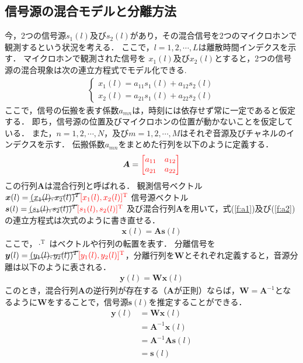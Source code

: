 \subsection{信号源の混合モデルと分離方法}
今，2つの信号源$s_1(l)$及び$s_2(l)$があり，その混合信号を2つのマイクロホンで観測するという状況を考える．
ここで，$l = 1, 2, \cdots , L$は離散時間インデクスを示す．
マイクロホンで観測された信号を
$x_1(l)$及び$x_2(l)$とすると，2つの信号源の混合現象は次の連立方程式でモデル化できる.
\begin{eqnarray}
  \begin{cases}
    x_1(l) = a_{11}s_1(l) + a_{12}s_2(l)  \label{f:a1}\\
    x_2(l) = a_{21}s_1(l) + a_{22}s_2(l)  \label{f:a2}
  \end{cases}
\end{eqnarray}
ここで，信号の伝搬を表す係数$a_{mn}$は，時刻には依存せず常に一定であると仮定する．
即ち，信号源の位置及びマイクロホンの位置が動かないことを仮定している．
また，$n = 1, 2, \cdots , N$，及び$m =
1, 2, \cdots , M $はそれぞ音源及びチャネルのインデクスを示す．
伝搬係数$a_{mn}$をまとめた行列を以下のように定義する．
\begin{align}
    \bm{A} = \textcolor{red}{\begin{bmatrix}
    a_{11}  & a_{12}  \\
    a_{21}  & a_{22}  \\
    \end{bmatrix}}
\end{align}
この行列$\bm{A}$は混合行列と呼ばれる．
観測信号ベクトル$\bm{x}(l) = \cancel{(x_1(l),x_2(l))^T} \textcolor{red}{[x_1(l),x_2(l)]^\mathrm{T}}$
信号源ベクトル$\bm{s}(l) = \cancel{(s_1(l),s_2(l))^T} \textcolor{red}{[s_1(l),s_2(l)]^\mathrm{T}}$
及び混合行列$\bm{A}$を用いて，式(\ref{f:a1})及び(\ref{f:a2})の連立方程式は次式のように書き直せる．
\begin{align}
    \bm{x}(l) = \bm{A}\bm{s}(l)　\label{f:x}
\end{align}
ここで，$\cdot^\mathrm{T}$ はベクトルや行列の転置を表す．
分離信号を$\bm{y}(l) = \cancel{(y_1(l),y_2(l))^T} \textcolor{red}{[y_1(l),y_2(l)]^\mathrm{T}}$，分離行列を$\bm{W}$とそれぞれ定義すると，音源分離は以下のように表される．
\begin{align}
    \bm{y}(l) = \bm{W}\bm{x}(l)
\end{align}
このとき，混合行列$\bm{A}$の逆行列が存在する（$\bm{A}$が正則）ならば，$\bm{W}=\bm{A}^{-1}$となるように$\bm{W}$をすることで，信号源$\bm{s}(l)$を推定することができる．
\begin{align}
    \bm{y}(l) &= \bm{W}\bm{x}(l)\\
    &= \bm{A}^{-1}\bm{x}(l)\\
    &= \bm{A}^{-1}\bm{A}\bm{s}(l)\\
    &= \bm{s}(l)
\end{align}

